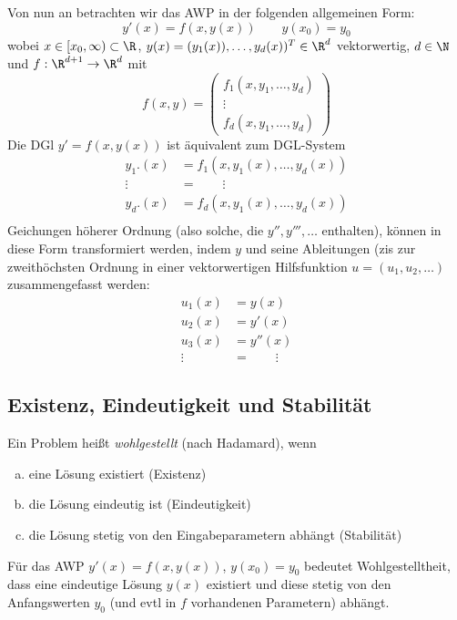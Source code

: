 \documentclass[
]{mycourse}
\begin{document}
Von nun an betrachten wir das AWP in der folgenden allgemeinen Form:
\[
	y'(x) = f(x,y(x))
	\qquad y(x_0) = y_0
\]
wobei $x \in [x_0,\infty) \subset \R$, $y(x) = (y_1(x)),\dotsc,y_d(x))^T \in \R^d$ vektorwertig, $d \in \N$ und $f : \R^{d+1} \to \R^d$ mit
\[
	f(x,y) = \begin{pmatrix}
		f_1(x,y_1,\dotsc, y_d) \\
		\vdots \\
		f_d(x,y_1,\dotsc, y_d)
	\end{pmatrix}
\]
Die DGl $y' = f(x,y(x))$ ist äquivalent zum DGL-System
\begin{align*}
	y_1.(x) &= f_1(x,y_1(x),\dotsc,y_d(x)) \\
	\vdots \quad &= \qquad \vdots \\
	y_d.(x) &= f_d(x,y_1(x),\dotsc,y_d(x)) \\
\end{align*}
Geichungen höherer Ordnung (also solche, die $y'', y''', \dotsc$ enthalten), können in diese Form transformiert werden, indem $y$ und seine Ableitungen (zis zur zweithöchsten Ordnung in einer vektorwertigen Hilfsfunktion $u=(u_1,u_2,\dotsc)$ zusammengefasst werden:
\begin{align*}
	u_1(x) &= y(x) \\
	u_2(x) &= y'(x) \\
	u_3(x) &= y''(x) \\
	\vdots \quad&= \qquad \vdots
\end{align*}


\begin{ex} \label{1.4}
	\fixme[$y'=y'''$]
\end{ex}


\subsection{Existenz, Eindeutigkeit und Stabilität}


Ein Problem heißt \emph{wohlgestellt} (nach Hadamard), wenn
\begin{enumerate}[a)]
	\item
		eine Lösung existiert (Existenz)
	\item
		die Lösung eindeutig ist (Eindeutigkeit)
	\item
		die Lösung stetig von den Eingabeparametern abhängt (Stabilität)
\end{enumerate}
Für das AWP $y'(x) = f(x,y(x))$, $y(x_0) = y_0$ bedeutet Wohlgestelltheit, dass eine eindeutige Lösung $y(x)$ existiert und diese stetig von den Anfangswerten $y_0$ (und evtl in $f$ vorhandenen Parametern) abhängt.
\end{document}
